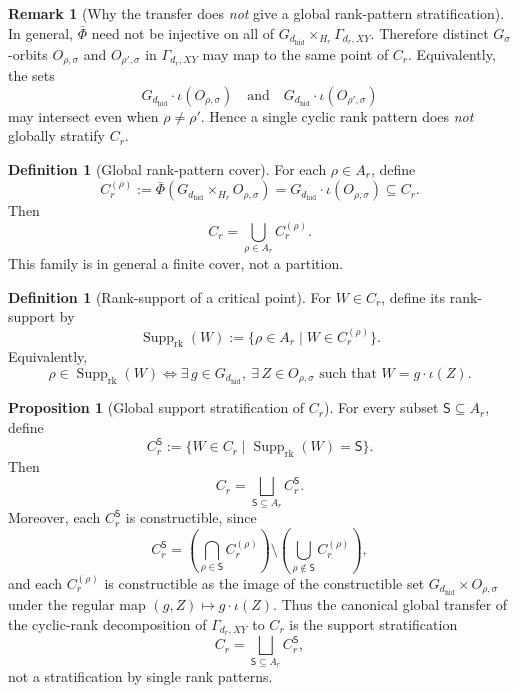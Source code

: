 \documentclass{article}
\newcommand{\Supp}{\operatorname{Supp}}
\theoremstyle{definition}
\newtheorem{proposition}[theorem]{Proposition}
\newtheorem{definition}[theorem]{Definition}
\newtheorem{remark}[theorem]{Remark}
\begin{document}
\begin{remark}[Why the transfer does \emph{not} give a global rank-pattern stratification]
In general, \(\bar\Phi\) need not be injective on all of
\(G_{d_{\mathrm{hid}}}\times_{H_r}\Gamma_{d_r,XY}\). Therefore distinct
\(G_{\sigma}\)-orbits \(O_{\rho,\sigma}\) and \(O_{\rho',\sigma}\) in
\(\Gamma_{d_r,XY}\) may map to the same point of \(C_r\). Equivalently, the sets
\[
G_{d_{\mathrm{hid}}}\cdot \iota(O_{\rho,\sigma})
\quad\text{and}\quad
G_{d_{\mathrm{hid}}}\cdot \iota(O_{\rho',\sigma})
\]
may intersect even when \(\rho\neq \rho'\). Hence a single cyclic rank pattern does
\emph{not} globally stratify \(C_r\).
\end{remark}

\begin{definition}[Global rank-pattern cover]
For each \(\rho\in A_r\), define
\[
C_r^{(\rho)}
:=
\bar\Phi\!\left(G_{d_{\mathrm{hid}}}\times_{H_r}O_{\rho,\sigma}\right)
=
G_{d_{\mathrm{hid}}}\cdot \iota(O_{\rho,\sigma})
\subseteq C_r.
\]
Then
\[
C_r=\bigcup_{\rho\in A_r} C_r^{(\rho)}.
\]
This family is in general a finite cover, not a partition.
\end{definition}

\begin{definition}[Rank-support of a critical point]
For \(W\in C_r\), define its rank-support by
\[
\Supp_{\mathrm{rk}}(W)
:=
\{\rho\in A_r\mid W\in C_r^{(\rho)}\}.
\]
Equivalently,
\[
\rho\in \Supp_{\mathrm{rk}}(W)
\iff
\exists\, g\in G_{d_{\mathrm{hid}}},\ \exists\, Z\in O_{\rho,\sigma}
\text{ such that } W=g\cdot \iota(Z).
\]
\end{definition}

\begin{proposition}[Global support stratification of \(C_r\)]
For every subset \(\mathsf S\subseteq A_r\), define
\[
C_r^{\mathsf S}
:=
\{W\in C_r\mid \Supp_{\mathrm{rk}}(W)=\mathsf S\}.
\]
Then
\[
C_r=\bigsqcup_{\mathsf S\subseteq A_r} C_r^{\mathsf S}.
\]
Moreover, each \(C_r^{\mathsf S}\) is constructible, since
\[
C_r^{\mathsf S}
=
\left(\bigcap_{\rho\in \mathsf S} C_r^{(\rho)}\right)
\setminus
\left(\bigcup_{\rho\notin \mathsf S} C_r^{(\rho)}\right),
\]
and each \(C_r^{(\rho)}\) is constructible as the image of the constructible set
\(G_{d_{\mathrm{hid}}}\times O_{\rho,\sigma}\) under the regular map
\((g,Z)\mapsto g\cdot \iota(Z)\).
Thus the canonical global transfer of the cyclic-rank decomposition of
\(\Gamma_{d_r,XY}\) to \(C_r\) is the support stratification
\[
C_r=\bigsqcup_{\mathsf S\subseteq A_r} C_r^{\mathsf S},
\]
not a stratification by single rank patterns.
\end{proposition}
\end{document}
